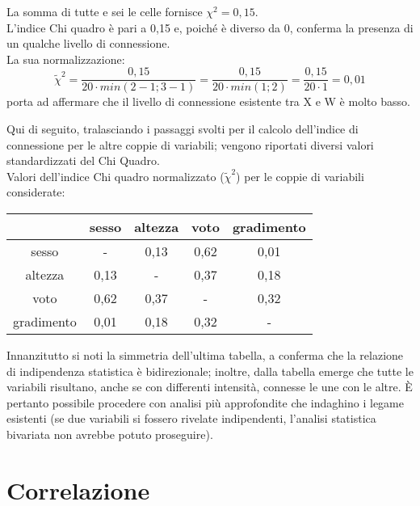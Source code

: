 \begin{esempio}
\vspace{6pt}
La somma di tutte e sei le celle fornisce \(\chi^2=0,15\).\\
L'indice Chi quadro è pari a 0,15 e, poiché è diverso da 0, conferma la 
presenza di un qualche livello di connessione.\\
La sua normalizzazione:
\[\widetilde{\chi}^2=\frac{0,15}{20\cdot min(2-1;3-1)}=\frac{0,15}{20\cdot 
min(1;2)}=\frac{0,15}{20\cdot 1}=0,01\]
porta ad affermare che il livello di connessione esistente tra X e W è 
molto basso.
\end{esempio}

Qui di seguito, tralasciando i passaggi svolti per il calcolo dell'indice 
di connessione per le altre coppie di variabili; vengono riportati diversi 
valori standardizzati del Chi Quadro.\\ Valori dell'indice Chi quadro 
normalizzato (\(\widetilde{\chi}^2\)) per le coppie di variabili 
considerate:

\begin{center}
\begin{tabular}{|c|c|c|c|c|}
        \hline
           &    sesso    & altezza   & voto   & gradimento\\
 \hline
sesso      &      -   &      0,13&   0,62&   0,01\\
        \hline
altezza    &      0,13&   -&      0,37&   0,18\\
        \hline
voto       &      0,62&   0,37&-&         0,32\\
        \hline
gradimento &      0,01&   0,18&   0,32&-\\
        \hline          
\end{tabular}
\end{center}

\vspace{6pt}
Innanzitutto si noti la simmetria dell'ultima tabella, a conferma che la 
relazione di indipendenza statistica è bidirezionale; inoltre, dalla 
tabella emerge che tutte le variabili risultano, anche se con differenti 
intensità, connesse le une con le altre. È pertanto possibile procedere con 
analisi più approfondite che indaghino i legame esistenti (se due variabili 
si fossero rivelate indipendenti, l'analisi statistica bivariata non avrebbe 
potuto proseguire).


\section{Correlazione}
\label{sec:stat02_correlazione}

